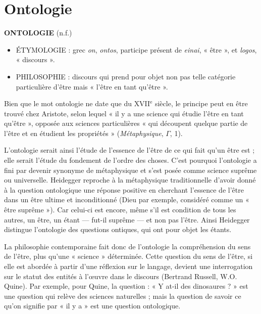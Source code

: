
\chapter{Ontologie}

{\bf O{\footnotesize NTOLOGIE}} (n.f.)

\begin{itemize}[leftmargin=1cm, label=, itemsep=1pt]
\item {\footnotesize ÉTYMOLOGIE} : grec {\it on}, {\it ontos}, participe présent de {\it einai}, « être », et
{\it logos}, « discours ».
\item {\footnotesize PHILOSOPHIE} : discours qui prend pour objet non
pas telle catégorie particulière d’être
mais « l'être en tant qu'être ».
\end{itemize}

Bien que le mot ontologie ne date que
du {\footnotesize XVII}$^\text{e}$ siècle, le principe peut en être
trouvé chez Aristote, selon lequel « il y
a une science qui étudie l'être en tant
qu'être », opposée aux sciences particulières « qui découpent quelque partie de
l'être et en étudient les propriétés »
({\it Métaphysique}, $\Gamma$, 1).

L'ontologie serait ainsi l'étude de l’essence de l’être de ce qui fait qu'un être
est ; elle serait l'étude du fondement de
l'ordre des choses. C’est pourquoi l’ontologie a fini par devenir synonyme de
métaphysique et s'est posée comme
science suprême ou universelle.
Heidegger reproche à la métaphysique
traditionnelle d’avoir donné à la question ontologique une réponse positive
en cherchant l'essence de l'être dans un
être ultime et inconditionné (Dieu par
exemple, considéré comme un « être
suprême »). Car celui-ci est encore,
même s'il est condition de tous les
autres, un être, un étant — fut-il
suprême — et non pas l'être. Ainsi Heidegger distingue l’ontologie des questions ontiques, qui ont pour objet les
étants.

La philosophie contemporaine fait donc
de l’ontologie la compréhension du sens
de l’être, plus qu'une « science » déterminée. Cette question du sens de l'être,
si elle est abordée à partir d'une
réflexion sur le langage, devient une
interrogation sur le statut des entités à
l'œuvre dans le discours (Bertrand Russell, W.O. Quine). Par exemple, pour
Quine, la question : « Y at-il des dinosaures ? » est une question qui relève des
sciences naturelles ; mais la question de
savoir ce qu'on signifie par « il y a » est
une question ontologique.


